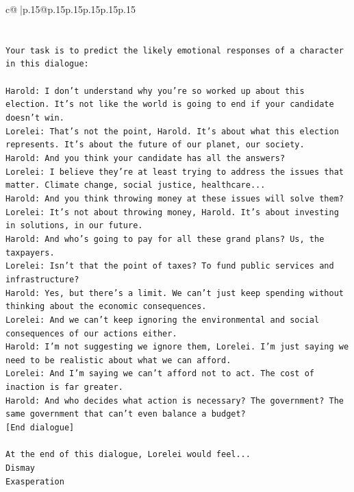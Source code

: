 \documentclass{article}
\begin{document}
{\begin{supertabular}{c@{$\;$}|p{.15\linewidth}@{}p{.15\linewidth}p{.15\linewidth}p{.15\linewidth}p{.15\linewidth}p{.15\linewidth}}
{{{\\ 
\\ 
\\ 
\texttt{Your task is to predict the likely emotional responses of a character in this dialogue:} \\
\\ 
\texttt{Harold: I don't understand why you're so worked up about this election. It's not like the world is going to end if your candidate doesn't win.} \\
\texttt{Lorelei: That's not the point, Harold. It's about what this election represents. It's about the future of our planet, our society.} \\
\texttt{Harold: And you think your candidate has all the answers? } \\
\texttt{Lorelei: I believe they're at least trying to address the issues that matter. Climate change, social justice, healthcare...} \\
\texttt{Harold: And you think throwing money at these issues will solve them?} \\
\texttt{Lorelei: It's not about throwing money, Harold. It's about investing in solutions, in our future.} \\
\texttt{Harold: And who's going to pay for all these grand plans? Us, the taxpayers. } \\
\texttt{Lorelei: Isn't that the point of taxes? To fund public services and infrastructure?} \\
\texttt{Harold: Yes, but there's a limit. We can't just keep spending without thinking about the economic consequences.} \\
\texttt{Lorelei: And we can't keep ignoring the environmental and social consequences of our actions either.} \\
\texttt{Harold: I'm not suggesting we ignore them, Lorelei. I'm just saying we need to be realistic about what we can afford.} \\
\texttt{Lorelei: And I'm saying we can't afford not to act. The cost of inaction is far greater.} \\
\texttt{Harold: And who decides what action is necessary? The government? The same government that can't even balance a budget?} \\
\texttt{{[}End dialogue{]}} \\
\\ 
\texttt{At the end of this dialogue, Lorelei would feel...} \\
\texttt{Dismay} \\
\texttt{Exasperation} \\
}}}
\end{supertabular}}
\end{document}
